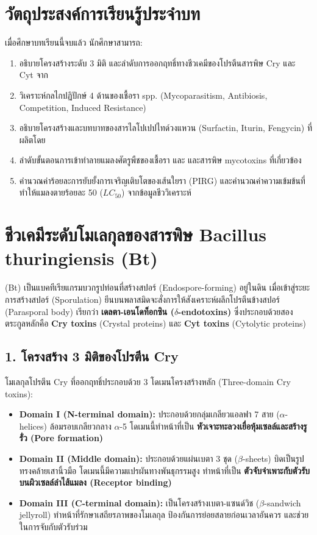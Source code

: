 \section*{วัตถุประสงค์การเรียนรู้ประจำบท}
เมื่อศึกษาบทเรียนนี้จบแล้ว นักศึกษาสามารถ:
\begin{enumerate}
    \item อธิบายโครงสร้างระดับ 3 มิติ และลำดับการออกฤทธิ์ทางชีวเคมีของโปรตีนสารพิษ Cry และ Cyt จาก 
    \item วิเคราะห์กลไกปฏิปักษ์ 4 ด้านของเชื้อรา  spp. (Mycoparasitism, Antibiosis, Competition, Induced Resistance)
    \item อธิบายโครงสร้างและบทบาทของสารไลโปเปปไทด์วงแหวน (Surfactin, Iturin, Fengycin) ที่ผลิตโดย 
    \item ลำดับขั้นตอนการเข้าทำลายแมลงศัตรูพืชของเชื้อรา  และ  และสารพิษ mycotoxins ที่เกี่ยวข้อง
    \item คำนวณค่าร้อยละการยับยั้งการเจริญเติบโตของเส้นใยรา (PIRG) และคำนวณค่าความเข้มข้นที่ทำให้แมลงตายร้อยละ 50 ($LC_{50}$) จากข้อมูลชีววิเคราะห์
\end{enumerate}

\section{ชีวเคมีระดับโมเลกุลของสารพิษ Bacillus thuringiensis (Bt)}

 (Bt) เป็นแบคทีเรียแกรมบวกรูปท่อนที่สร้างสปอร์ (Endospore-forming) อยู่ในดิน เมื่อเข้าสู่ระยะการสร้างสปอร์ (Sporulation) ยีนบนพลาสมิดจะสั่งการให้สังเคราะห์ผลึกโปรตีนข้างสปอร์ (Parasporal body) เรียกว่า \textbf{เดลตา-เอนโดท็อกซิน ($\delta$-endotoxins)} ซึ่งประกอบด้วยสองตระกูลหลักคือ \textbf{Cry toxins} (Crystal proteins) และ \textbf{Cyt toxins} (Cytolytic proteins)

\subsection{1. โครงสร้าง 3 มิติของโปรตีน Cry}
โมเลกุลโปรตีน Cry ที่ออกฤทธิ์ประกอบด้วย 3 โดเมนโครงสร้างหลัก (Three-domain Cry toxins):
\begin{itemize}
    \item \textbf{Domain I (N-terminal domain):} ประกอบด้วยกลุ่มเกลียวแอลฟา 7 สาย ($\alpha$-helices) ล้อมรอบเกลียวกลาง $\alpha$-5 โดเมนนี้ทำหน้าที่เป็น \textbf{หัวเจาะทะลวงเยื่อหุ้มเซลล์และสร้างรูรั่ว (Pore formation)}
    \item \textbf{Domain II (Middle domain):} ประกอบด้วยแผ่นเบตา 3 ชุด ($\beta$-sheets) บิดเป็นรูปทรงคล้ายเสานิ้วมือ โดเมนนี้มีความแปรผันทางพันธุกรรมสูง ทำหน้าที่เป็น \textbf{ตัวจับจำเพาะกับตัวรับบนผิวเซลล์ลำไส้แมลง (Receptor binding)}
    \item \textbf{Domain III (C-terminal domain):} เป็นโครงสร้างเบตา-แซนด์วิช ($\beta$-sandwich jellyroll) ทำหน้าที่รักษาเสถียรภาพของโมเลกุล ป้องกันการย่อยสลายก่อนเวลาอันควร และช่วยในการจับกับตัวรับร่วม
\end{itemize}


